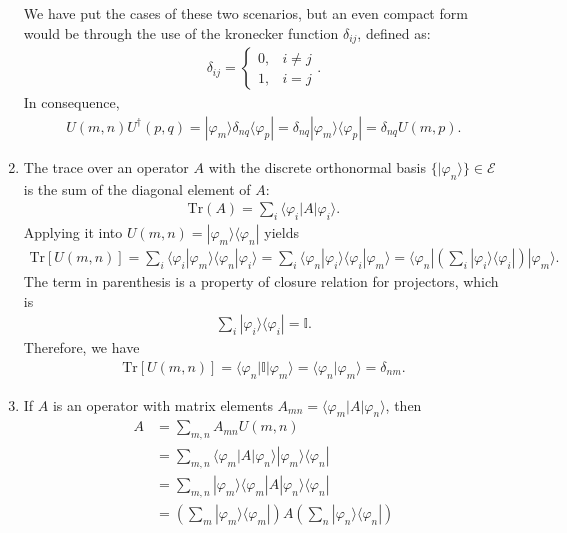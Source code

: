 \documentclass[letterpaper,11pt,twoside]{article}
\begin{document}
\begin{enumerate}[itemsep=0pt,topsep=0pt,label=\alph*.]
  We have put the cases of these two scenarios, but an even compact form would be through the use of the kronecker function $\delta_{ij}$, defined as:
  \begin{align*}
    \delta_{ij}=\begin{cases}
      0,&i\neq j\\
      1,&i=j
    \end{cases}.
  \end{align*}
  In consequence,
  \begin{align*}
    U(m,n)U^\dagger (p,q)=|\varphi_m\rangle\delta_{nq}\langle\varphi_p|=\delta_{nq}|\varphi_m\rangle\langle\varphi_p|=\delta_{nq}U(m,p).
  \end{align*}
  \item The trace over an operator $A$ with the discrete orthonormal basis $\{|\varphi_n\rangle\}\in\mathcal{E}$ is the sum of 
  the diagonal element of $A$:
  \begin{align*}
    \text{Tr}(A)=\sum_i\langle \varphi_i|A|\varphi_i\rangle.
  \end{align*}
  Applying it into $U(m,n)=|\varphi_m\rangle\langle\varphi_n|$ yields
  \begin{align*}
    \text{Tr}[U(m,n)]=\sum_i\langle \varphi_i|\varphi_m\rangle\langle\varphi_n|\varphi_i\rangle=\sum_i\langle\varphi_n|\varphi_i\rangle\langle \varphi_i|\varphi_m\rangle=\langle\varphi_n|\left(\sum_i|\varphi_i\rangle\langle\varphi_i|\right)|\varphi_m\rangle.
  \end{align*}
  The term in parenthesis is a property of closure relation for projectors, which is 
  \begin{align*}
    \sum_i|\varphi_i\rangle\langle\varphi_i|=\mathbb{I}.
  \end{align*}
  Therefore, we have 
  \begin{align*}
    \text{Tr}[U(m,n)]=\langle\varphi_n|\mathbb{I}|\varphi_m\rangle=\langle\varphi_n|\varphi_m\rangle=\delta_{nm}.
  \end{align*}
  \item If $A$ is an operator with matrix elements $A_{mn}=\langle\varphi_m|A|\varphi_n\rangle$, then
  \begin{align*}
    A&=\sum_{m,n}A_{mn}U(m,n)\\
    &=\sum_{m,n}\langle\varphi_m|A|\varphi_n\rangle |\varphi_m\rangle\langle\varphi_n|\\
    &=\sum_{m,n}|\varphi_m\rangle\langle\varphi_m|A|\varphi_n\rangle\langle\varphi_n|\\
    &=\left(\sum_m|\varphi_m\rangle\langle\varphi_m|\right)A\left(\sum_n|\varphi_n\rangle\langle\varphi_n|\right)\\

\end{align*}
\end{enumerate}
\end{document}
